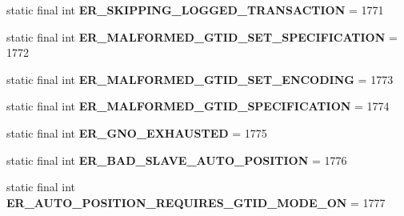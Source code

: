 \begin{DoxyCompactItemize}
\item 
\mbox{\label{classcom_1_1mysql_1_1jdbc_1_1_mysql_error_numbers_a4d927a8a2588b4af4e13a5ca98b9694d}} 
static final int {\bfseries E\+R\+\_\+\+S\+K\+I\+P\+P\+I\+N\+G\+\_\+\+L\+O\+G\+G\+E\+D\+\_\+\+T\+R\+A\+N\+S\+A\+C\+T\+I\+ON} = 1771
\item 
\mbox{\label{classcom_1_1mysql_1_1jdbc_1_1_mysql_error_numbers_a83e51427bbcc425870c78079e537d81f}} 
static final int {\bfseries E\+R\+\_\+\+M\+A\+L\+F\+O\+R\+M\+E\+D\+\_\+\+G\+T\+I\+D\+\_\+\+S\+E\+T\+\_\+\+S\+P\+E\+C\+I\+F\+I\+C\+A\+T\+I\+ON} = 1772
\item 
\mbox{\label{classcom_1_1mysql_1_1jdbc_1_1_mysql_error_numbers_a4419466e43d3fdbc8e69d40ad4682652}} 
static final int {\bfseries E\+R\+\_\+\+M\+A\+L\+F\+O\+R\+M\+E\+D\+\_\+\+G\+T\+I\+D\+\_\+\+S\+E\+T\+\_\+\+E\+N\+C\+O\+D\+I\+NG} = 1773
\item 
\mbox{\label{classcom_1_1mysql_1_1jdbc_1_1_mysql_error_numbers_a133b176a2bd263668b92697f86415701}} 
static final int {\bfseries E\+R\+\_\+\+M\+A\+L\+F\+O\+R\+M\+E\+D\+\_\+\+G\+T\+I\+D\+\_\+\+S\+P\+E\+C\+I\+F\+I\+C\+A\+T\+I\+ON} = 1774
\item 
\mbox{\label{classcom_1_1mysql_1_1jdbc_1_1_mysql_error_numbers_a51bc30b0ed2660f68ca223019798f6a4}} 
static final int {\bfseries E\+R\+\_\+\+G\+N\+O\+\_\+\+E\+X\+H\+A\+U\+S\+T\+ED} = 1775
\item 
\mbox{\label{classcom_1_1mysql_1_1jdbc_1_1_mysql_error_numbers_a73087c0eed6d228aa24f896b612e7e74}} 
static final int {\bfseries E\+R\+\_\+\+B\+A\+D\+\_\+\+S\+L\+A\+V\+E\+\_\+\+A\+U\+T\+O\+\_\+\+P\+O\+S\+I\+T\+I\+ON} = 1776
\item 
\mbox{\label{classcom_1_1mysql_1_1jdbc_1_1_mysql_error_numbers_a3bd957a63ca098bbde2527c617365f59}} 
static final int {\bfseries E\+R\+\_\+\+A\+U\+T\+O\+\_\+\+P\+O\+S\+I\+T\+I\+O\+N\+\_\+\+R\+E\+Q\+U\+I\+R\+E\+S\+\_\+\+G\+T\+I\+D\+\_\+\+M\+O\+D\+E\+\_\+\+ON} = 1777

\end{DoxyCompactItemize}
